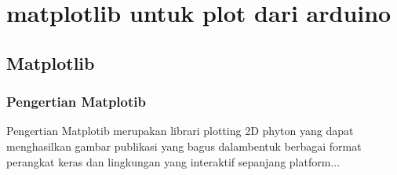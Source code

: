 
\section {matplotlib untuk plot dari arduino}

\subsection {Matplotlib}
\subsubsection {Pengertian Matplotib}
	Pengertian Matplotib merupakan librari plotting 2D phyton yang dapat menghasilkan gambar publikasi yang bagus dalambentuk berbagai format perangkat keras dan lingkungan yang interaktif sepanjang platform...
	

